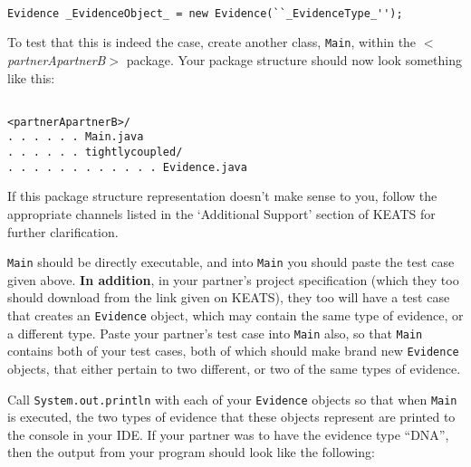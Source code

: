 \documentclass[11pt]{article}
\begin{document}
\vspace{-8mm}

\begin{verbatim}

Evidence _EvidenceObject_ = new Evidence(``_EvidenceType_'');

\end{verbatim}

\vspace{-8mm}

To test that this is indeed the case, create another class, \texttt{Main}, within the $<$\emph{partnerApartnerB}$>$ package. Your package structure should now look something like this:

\vspace{-8mm}

\begin{verbatim}

<partnerApartnerB>/
. . . . . . Main.java
. . . . . . tightlycoupled/
. . . . . . . . . . . . Evidence.java

\end{verbatim}

\vspace{-8mm}

If this package structure representation doesn't make sense to you, follow the appropriate channels listed in the `Additional Support' section of KEATS for further clarification.

\texttt{Main} should be directly executable, and into \texttt{Main} you should paste the test case given above. \textbf{In addition}, in your partner's project specification (which they too should download from the link given on KEATS), they too will have a test case that creates an \texttt{Evidence} object, which may contain the same type of evidence, or a different type. Paste your partner's test case into \texttt{Main} also, so that \texttt{Main} contains both of your test cases, both of which should make brand new \texttt{Evidence} objects, that either pertain to two different, or two of the same types of evidence. 

Call \texttt{System.out.println} with each of your \texttt{Evidence} objects so that when \texttt{Main} is executed, the two types of evidence that these objects represent are printed to the console in your IDE. If your partner was to have the evidence type ``DNA'', then the output from your program should look like the following:

\vspace{-8mm}
\end{document}
